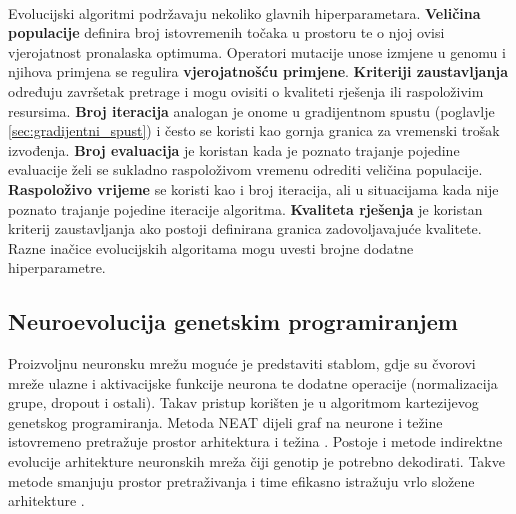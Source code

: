 \documentclass[times, utf8, numeric, diplomski]{fer}
\def\secref#1{(poglavlje \ref{#1})}
\begin{document}
\paragraph{}
Evolucijski algoritmi podržavaju nekoliko glavnih hiperparametara. \textbf{Veličina populacije} definira broj istovremenih točaka u prostoru te o njoj ovisi vjerojatnost pronalaska optimuma. Operatori mutacije unose izmjene u genomu i njihova primjena se regulira \textbf{vjerojatnošću primjene}. \textbf{Kriteriji zaustavljanja} određuju završetak pretrage i mogu ovisiti o kvaliteti rješenja ili raspoloživim resursima. \textbf{Broj iteracija} analogan je onome u gradijentnom spustu \secref{sec:gradijentni_spust} i često se koristi kao gornja granica za vremenski trošak izvođenja. \textbf{Broj evaluacija} je koristan kada je poznato trajanje pojedine evaluacije želi se sukladno raspoloživom vremenu odrediti veličina populacije. \textbf{Raspoloživo vrijeme} se koristi kao i broj iteracija, ali u situacijama kada nije poznato trajanje pojedine iteracije algoritma. \textbf{Kvaliteta rješenja} je koristan kriterij zaustavljanja ako postoji definirana granica zadovoljavajuće kvalitete. Razne inačice evolucijskih algoritama mogu uvesti brojne dodatne hiperparametre.

%

\subsection{Neuroevolucija genetskim programiranjem}
Proizvoljnu neuronsku mrežu moguće je predstaviti stablom, gdje su čvorovi mreže ulazne i aktivacijske funkcije neurona te dodatne operacije (normalizacija grupe, dropout i ostali). Takav pristup korišten je u \citet{evo_atari} algoritmom kartezijevog genetskog programiranja. Metoda NEAT dijeli graf na neurone i težine istovremeno pretražuje prostor arhitektura i težina \citep{neat}. Postoje i metode indirektne evolucije arhitekture neuronskih mreža čiji genotip je potrebno dekodirati. Takve metode smanjuju prostor pretraživanja i time efikasno istražuju vrlo složene arhitekture \citep{gruau}.
\end{document}
